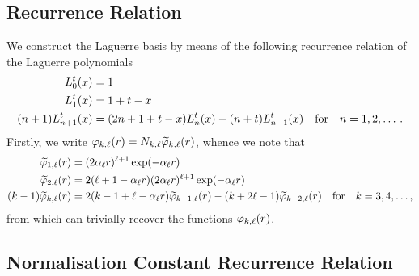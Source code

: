 \documentclass[]{article}
\begin{document}
\subsection{Recurrence Relation}
\label{sec:recurrence-relation}

We construct the Laguerre basis by means of the following recurrence relation of
the Laguerre polynomials
\begin{alignat*}{2}
  L_{0}^{t}\lr{x}
  {}={}
  &
  1
  \\
  L_{1}^{t}\lr{x}
  {}={}
  &
  1
  +
  t
  -
  x
  \\
  \lr{n + 1}
  L_{n + 1}^{t}\lr{x}
  {}={}
  &
  \lr
  {
    2
    n
    +
    1
    +
    t
    -
    x
  }
  L_{n}^{t}\lr{x}
  -
  \lr{n + t}
  L_{n - 1}^{t}\lr{x}
  \qq{for}
  n = 1, 2, \dotsc.
\end{alignat*}
Firstly, we write
$\varphi_{k, \ell}(r) = N_{k, \ell}\widetilde{\varphi}_{k, \ell}(r)$,
whence we note that
\begin{alignat*}{2}
  \widetilde{\varphi}_{1, \ell}\lr{r}
  {}={}
  &
  \lr
  {
    2
    \alpha_{\ell}
    r
  }^{\ell + 1}
  \exponential\lr
  {
    -
    \alpha_{\ell}
    r
  }
  \\
  \widetilde{\varphi}_{2, \ell}\lr{r}
  {}={}
  &
  2
  \lr
  {
    \ell
    +
    1
    -
    \alpha_{\ell}
    r
  }
  \lr
  {
    2
    \alpha_{\ell}
    r
  }^{\ell + 1}
  \exponential\lr
  {
    -
    \alpha_{\ell}
    r
  }
  \\
  \lr{k - 1}
  \widetilde{\varphi}_{k, \ell}\lr{r}
  {}={}
  &
  2
  \lr
  {
    k
    -
    1
    +
    \ell
    -
    \alpha_{\ell}
    r
  }
  \widetilde{\varphi}_{k - 1, \ell}\lr{r}
  -
  \lr
  {
    k
    +
    2
    \ell
    -
    1
  }
  \widetilde{\varphi}_{k - 2, \ell}\lr{r}
  \qq{for}
  k = 3, 4, \dotsc,
\end{alignat*}
from which can trivially recover the functions $\varphi_{k, \ell}(r)$.

\subsection{Normalisation Constant Recurrence Relation}
\label{sec:norm-const}
\end{document}
